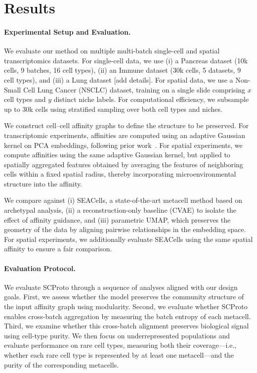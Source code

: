 \section{Results}
\paragraph{Experimental Setup and Evaluation.}
We evaluate our method on multiple multi-batch single-cell and spatial transcriptomics datasets. 
For single-cell data, we use (i) a Pancreas dataset (10k cells, 9 batches, 16 cell types), 
(ii) an Immune dataset (30k cells, 5 datasets, 9 cell types), and (iii) a Lung dataset [add details]. 
For spatial data, we use a Non-Small Cell Lung Cancer (NSCLC) dataset, training on a single slide comprising $x$ cell types and $y$ distinct niche labels. For computational efficiency, we subsample up to 30k cells using stratified sampling over both cell types and niches.

We construct cell--cell affinity graphs to define the structure to be preserved.
For transcriptomic experiments, affinities are computed using an adaptive Gaussian kernel on PCA embeddings, following prior work~\cite{seacell}. 
For spatial experiments, we compute affinities using the same adaptive Gaussian kernel, but applied to spatially aggregated features obtained by averaging the features of neighboring cells within a fixed spatial radius, thereby incorporating microenvironmental structure into the affinity.

We compare against (i) SEACells, a state-of-the-art metacell method based on archetypal analysis, 
(ii) a reconstruction-only baseline (CVAE) to isolate the effect of affinity guidance, and 
(iii) parametric UMAP, which preserves the geometry of the data by aligning pairwise relationships in the embedding space. 
For spatial experiments, we additionally evaluate SEACells using the same spatial affinity to ensure a fair comparison.

\paragraph{Evaluation Protocol.}
We evaluate SCProto through a sequence of analyses aligned with our design goals.
First, we assess whether the model preserves the community structure of the input affinity graph using modularity.
Second, we evaluate whether SCProto enables cross-batch aggregation by measuring the batch entropy of each metacell.
Third, we examine whether this cross-batch alignment preserves biological signal using cell-type purity. We then focus on underrepresented populations and evaluate performance on rare cell types, measuring both their coverage—i.e., whether each rare cell type is represented by at least one metacell—and the purity of the corresponding metacells.

